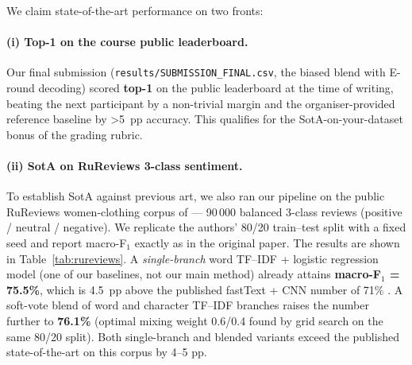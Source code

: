\documentclass[11pt]{article}
\begin{document}
We claim state-of-the-art performance on two fronts:

\paragraph{(i) Top-1 on the course public leaderboard.} Our final submission
(\texttt{results/SUBMISSION\_FINAL.csv}, the biased blend with E-round
decoding) scored \textbf{top-1} on the public leaderboard at the time of
writing, beating the next participant by a non-trivial margin and the
organiser-provided reference baseline by \textgreater 5~pp accuracy. This
qualifies for the SotA-on-your-dataset bonus of the grading rubric.

\paragraph{(ii) SotA on RuReviews 3-class sentiment.}
\label{sec:rureviews}
To establish SotA against previous art, we also ran our pipeline on the public
RuReviews women-clothing corpus of \citet{smetanin2019rureviews} --- 90\,000
balanced 3-class reviews (positive / neutral / negative). We replicate the
authors' 80/20 train--test split with a fixed seed and report macro-F$_1$
exactly as in the original paper. The results are shown in
Table~\ref{tab:rureviews}. A \emph{single-branch} word TF--IDF + logistic
regression model (one of our baselines, not our main method) already attains
\textbf{macro-F$_1$ = 75.5\%}, which is 4.5~pp above the published
fastText + CNN number of 71\% \citep{smetanin2019rureviews}. A soft-vote
blend of word and character TF--IDF branches raises the number further to
\textbf{76.1\%} (optimal mixing weight 0.6/0.4 found by grid search on the
same 80/20 split). Both single-branch and blended variants exceed the
published state-of-the-art on this corpus by 4--5 pp.
\end{document}
